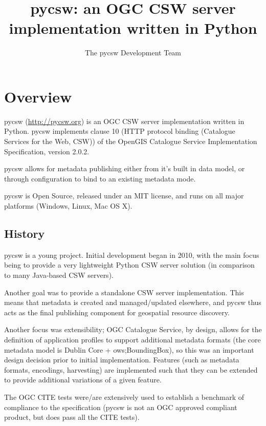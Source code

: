 

\title{pycsw: an OGC CSW server implementation written in Python}
\author{The pycsw Development Team}

\maketitle

\section{Overview}
\label{sec:overview}

pycsw (\url{http://pycsw.org}) is an OGC CSW server implementation written in Python.
pycsw implements clause 10 (HTTP protocol binding (Catalogue Services for the Web, CSW)) of the OpenGIS Catalogue Service Implementation Specification, version 2.0.2.

pycsw allows for metadata publishing either from it's built in data model, or through configuration to bind to an existing metadata mode.

pycsw is Open Source, released under an MIT license, and runs on all major platforms (Windows, Linux, Mac OS X).

\subsection{History}
\label{subsec:history}

pycsw is a young project.  Initial development began in 2010, with the main focus being to provide a very lightweight Python CSW server solution (in comparison to many Java-based CSW servers).

Another goal was to provide a standalone CSW server implementation.  This means that metadata is created and managed/updated elsewhere, and pycsw thus acts as the final publishing component for geospatial resource discovery.

Another focus was extensibility; OGC Catalogue Service, by design, allows for the definition of application profiles to support additional metadata formats (the core metadata model is Dublin Core + ows;BoundingBox), so this was an important design decision prior to initial implementation.  Features (such as metadata formats, encodings, harvesting) are implemented such that they can be extended to provide additional variations of a given feature.

The OGC CITE tests were/are extensively used to establish a benchmark of compliance to the specification (pycsw is not an OGC approved compliant product, but does pass all the CITE tests).

